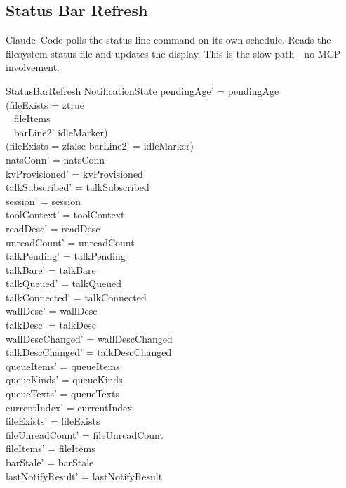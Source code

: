 \documentclass[a4paper,10pt,fleqn]{article}
\begin{document}
\subsection{Status Bar Refresh}

Claude~Code polls the status line command on its own schedule.
Reads the filesystem status file and updates the display.
This is the slow path---no MCP involvement.

\begin{schema}{StatusBarRefresh}
  \Delta NotificationState
  \where
  pendingAge' = pendingAge \\
  (fileExists = ztrue \land \\
  \quad~ fileItems \neq \langle \rangle \implies \\
  \quad~ barLine2' \neq idleMarker) \\
  (fileExists = zfalse \implies
  barLine2' = idleMarker) \\
  natsConn' = natsConn \\
  kvProvisioned' = kvProvisioned \\
  talkSubscribed' = talkSubscribed \\
  session' = session \\
  toolContext' = toolContext \\
  readDesc' = readDesc \\
  unreadCount' = unreadCount \\
  talkPending' = talkPending \\
  talkBare' = talkBare \\
  talkQueued' = talkQueued \\
  talkConnected' = talkConnected \\
  wallDesc' = wallDesc \\
  talkDesc' = talkDesc \\
  wallDescChanged' = wallDescChanged \\
  talkDescChanged' = talkDescChanged \\
  queueItems' = queueItems \\
  queueKinds' = queueKinds \\
  queueTexts' = queueTexts \\
  currentIndex' = currentIndex \\
  fileExists' = fileExists \\
  fileUnreadCount' = fileUnreadCount \\
  fileItems' = fileItems \\
  barStale' = barStale \\
  lastNotifyResult' = lastNotifyResult \\

\end{schema}
\end{document}

